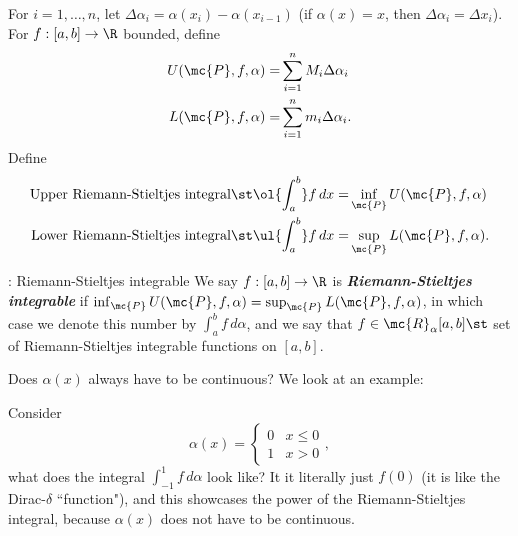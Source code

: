 For \(i=1,\dots, n\), let \(\Delta\alpha_i=\alpha(x_i)-\alpha(x_{i-1})\) (if \(\alpha(x)=x\), then \(\Delta\alpha_i=\Delta x_i\)). For \(f:[a,b]\to\R\) bounded, define 
\begin{align*}
	U(\mc{P},f,\alpha)=&\sum_{i=1}^{n}M_i\Delta \alpha_i\\
	L(\mc{P},f,\alpha)=&\sum_{i=1}^{n}m_i\Delta \alpha_i.
\end{align*}
Define
\begin{align*}
	\text{Upper Riemann-Stieltjes integral}\st \ol{\int_{a}^b}f \, dx=&\inf_\mc{P} U(\mc{P},f,\alpha)\\
	\text{Lower Riemann-Stieltjes integral}\st \ul{\int_{a}^b}f \, dx=&\sup_\mc{P} L(\mc{P},f,\alpha).
\end{align*}
\begin{ndef}{: Riemann-Stieltjes integrable}
	We say \(f:[a,b]\to\R\) is \emph{\textbf{Riemann-Stieltjes integrable}} if \(\inf_\mc{P} U(\mc{P},f,\alpha)=\sup_\mc{P} L(\mc{P},f,\alpha)\), in which case we denote this number by \(\displaystyle\int_{a}^b f \, d\alpha\), and we say that \(f\in\mc{R}_{\alpha}[a,b]\st\) set of Riemann-Stieltjes integrable functions on \([a,b]\).
\end{ndef}
Does \(\alpha(x)\) always have to be continuous? We look at an example:

\begin{example}
	Consider 
	\begin{equation*}
		\alpha(x)=\begin{cases}
						0&x\leq0\\
						1&x>0
				   \end{cases},
	\end{equation*}
	what does the integral \(\displaystyle\int_{-1}^1 f \, d\alpha\) look like? It it literally just \(f(0)\) (it is like the Dirac-\(\delta\) ``function"), and this showcases the power of the Riemann-Stieltjes integral, because \(\alpha(x)\) does not have to be continuous.
\end{example}